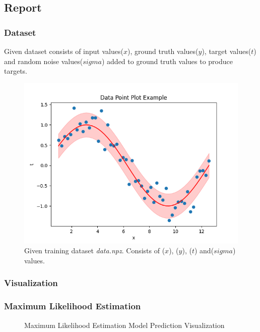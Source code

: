 \documentclass[12pt,twoside,a4paper]{article}
\begin{document}
\subsection{Report}
\subsubsection{Dataset}
Given dataset consists of input values($x$), ground truth values($y$), target values($t$) and random noise values($sigma$) added to ground truth values to produce targets.
\begin{figure}[!htb]
    \centering
    \includegraphics[width=0.7\linewidth]{results/gt_data.png}
    \caption{Given training dataset \textit{data.npz}. Consists of ($x$), ($y$), ($t$) and($sigma$) values.}
    \label{fig: DATASET}
\end{figure}

\pagebreak
\subsubsection{Visualization}

\subsubsection*{Maximum Likelihood Estimation}

\begin{figure}[!htb]
    \centering
    \hspace{0mm}
    \hspace{0mm}
    \caption{Maximum Likelihood Estimation Model Prediction Visualization}
\end{figure}
\end{document}
